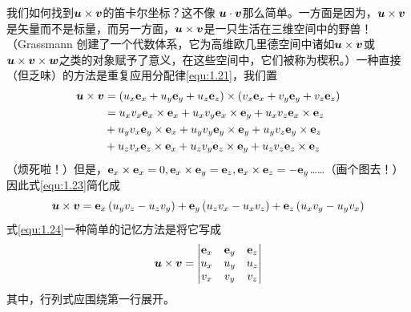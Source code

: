 我们如何找到$\bb{u}\times \bb{v}$的笛卡尔坐标？这不像 $\bb{u}\cdot \bb{v}$那么简单。一方面是因为，$\bb{u}\times \bb{v}$是矢量而不是标量，而另一方面，$\bb{u}\times \bb{v}$是一只生活在三维空间中的野兽！（Grassmann 创建了一个代数体系，它为高维欧几里德空间中诸如$\bb{u}\times \bb{v}$或$\bb{u}\times \bb{v}\times \bb{w}$之类的对象赋予了意义，在这些空间中，它们被称为楔积。）一种直接（但乏味）的方法是重复应用分配律\eqref{equ:1.21}，我们置
\begin{align}
	\bb{u}\times \bb{v}&=\left( u_x\bf{e}_x+u_y\bf{e}_y+u_z\bf{e}_z \right) \times \left( v_x\bf{e}_x+v_y\bf{e}_y+v_z\bf{e}_z \right)\nonumber\\
	&=u_xv_x\bf{e}_x\times \bf{e}_x+u_xv_y\bf{e}_x\times \bf{e}_y+u_xv_z\bf{e}_x\times \bf{e}_z\nonumber\\
	&+u_yv_x\bf{e}_y\times \bf{e}_x+u_yv_y\bf{e}_y\times \bf{e}_y+u_yv_z\bf{e}_y\times \bf{e}_z\nonumber\\
	&+u_zv_x\bf{e}_z\times \bf{e}_x+u_zv_y\bf{e}_z\times \bf{e}_y+u_zv_z\bf{e}_z\times \bf{e}_z\label{equ:1.23}
\end{align}
（烦死啦！）但是，$\bf{e}_x\times \bf{e}_x=0,\bf{e}_x\times \bf{e}_y=\bf{e}_z,\bf{e}_x\times \bf{e}_z=-\bf{e}_y$……（画个图去！）因此式\eqref{equ:1.23}简化成
\begin{equation}\label{equ:1.24}
    \bb{u}\times \bb{v}=\bf{e}_x\left( u_yv_z-u_zv_y \right) +\bf{e}_y\left( u_zv_x-u_xv_z \right) +\bf{e}_z\left( u_xv_y-u_yv_x \right) 
\end{equation}
式\eqref{equ:1.24}一种简单的记忆方法是将它写成
\begin{equation}\label{equ:1.25}
    \bb{u}\times \bb{v}=\left| \begin{matrix}
        \bf{e}_x&		\bf{e}_y&		\bf{e}_z\\
        u_x&		u_y&		u_z\\
        v_x&		v_y&		v_z\\
    \end{matrix} \right|
\end{equation}
其中，行列式应围绕第一行展开。

